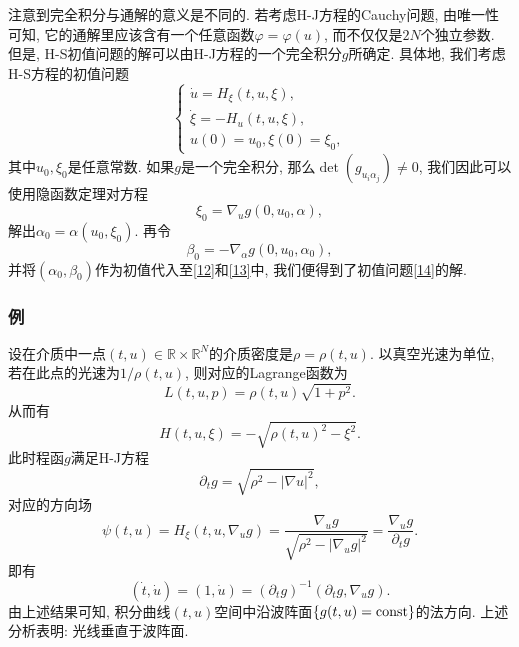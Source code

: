 \begin{remark}
    注意到完全积分与通解的意义是不同的. 若考虑H-J方程的Cauchy问题, 由唯一性可知, 它的通解里应该含有一个任意函数$\varphi = \varphi(u)$, 而不仅仅是$2N$个独立参数.
    但是, H-S初值问题的解可以由H-J方程的一个完全积分$g$所确定. 具体地, 我们考虑H-S方程的初值问题 
    \begin{equation}\label{14}
        \begin{cases} 
            \dot u = H_{\xi}(t, u, \xi), \\ 
            \dot \xi = -H_u(t, u, \xi), \\  
            u(0) = u_0, \xi(0) = \xi_0,  
        \end{cases}
    \end{equation}
    其中$u_0, \xi_0$是任意常数. 如果$g$是一个完全积分, 那么$\det(g_{u_i\alpha_j}) \neq 0$, 我们因此可以使用隐函数定理对方程 
    \begin{equation*}
        \xi_0 = \nabla_ug(0, u_0, \alpha), 
    \end{equation*}
    解出$\alpha_0 = \alpha(u_0, \xi_0)$. 再令 
    \begin{equation*}
        \beta_0 = -\nabla_{\alpha}g(0, u_0, \alpha_0), 
    \end{equation*}
    并将$(\alpha_0, \beta_0)$作为初值代入至\eqref{12}和\eqref{13}中, 我们便得到了初值问题\eqref{14}的解.
\end{remark}

\subsubsection{例}

\begin{example}[光在介质中的传播]
    设在介质中一点$(t, u) \in \mathbb{R} \times \mathbb{R}^N$的介质密度是$\rho = \rho(t, u)$.
    以真空光速为单位, 若在此点的光速为$1/\rho(t, u)$, 则对应的Lagrange函数为 
    \begin{equation*}
        L(t, u, p) = \rho(t, u)\sqrt{1 + p^2}.
    \end{equation*}
    从而有 
    \begin{equation*}
        H(t, u, \xi) = -\sqrt{\rho(t, u)^2 - \xi^2}.
    \end{equation*}
    此时程函$g$满足H-J方程 
    \begin{equation*}
        \partial_tg = \sqrt{\rho^2 - |\nabla u|^2},
    \end{equation*}
    对应的方向场 
    \begin{equation*}
        \psi(t, u) = H_{\xi}(t, u, \nabla_ug) = \frac{\nabla_ug}{\sqrt{\rho^2 - |\nabla_ug|^2}} = \frac{\nabla_ug}{\partial_tg}.
    \end{equation*}
    即有 
    \begin{equation*}
        (\dot t, \dot u) = (1, \dot u) = (\partial_tg)^{-1}(\partial_tg, \nabla_ug).
    \end{equation*}
    由上述结果可知, 积分曲线$(t, u)$空间中沿波阵面$\{g(t, u) = {\rm const}\}$的法方向.
    上述分析表明: 光线垂直于波阵面.
\end{example}

